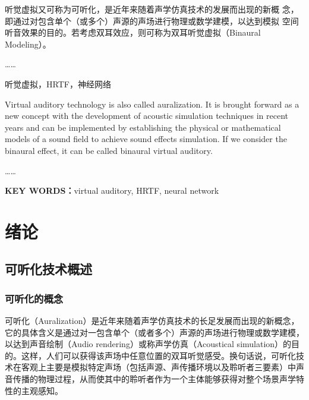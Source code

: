 \documentclass{nwputhesis}
\begin{document}

\newpage
\makeabstract

听觉虚拟又可称为可听化，是近年来随着声学仿真技术的发展而出现的新概
念，即通过对包含单个（或多个）声源的声场进行物理或数学建模，以达到模拟
空间听音效果的目的。若考虑双耳效应，则可称为双耳听觉虚拟（Binaural
Modeling）。

……

听觉虚拟，HRTF，神经网络

\makeEnabstract

Virtual auditory technology is also called auralization. It is brought forward as a new concept with the development of acoustic simulation techniques in recent years and can be implemented by establishing the physical or mathematical models of a sound field to achieve sound effects simulation. If we consider the binaural effect, it can be called binaural virtual auditory.

……

\noindent \textbf{ KEY WORDS：}virtual auditory, HRTF, neural network

\makecontent

\maketext

\section{绪论}
\subsection{可听化技术概述}
\subsubsection{可听化的概念}

可听化（Auralization）是近年来随着声学仿真技术的长足发展而出现的新概念，它的具体含义是通过对一包含单个（或者多个）声源的声场进行物理或数学建模，以达到声音绘制（Audio rendering）或称声学仿真（Acoustical simulation）的目的。这样，人们可以获得该声场中任意位置的双耳听觉感受。换句话说，可听化技术在客观上主要是模拟特定声场（包括声源、声传播环境以及聆听者三要素）中声音传播的物理过程，从而使其中的聆听者作为一个主体能够获得对整个场景声学特性的主观感知。
\end{document}
